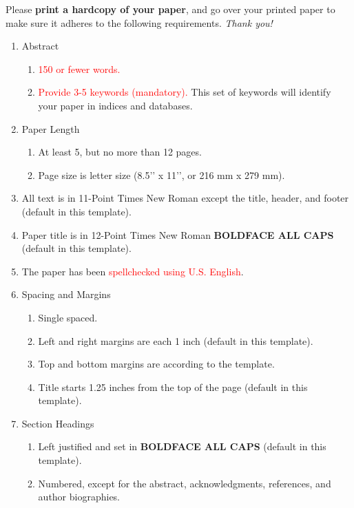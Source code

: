 \documentclass{scspaperproc}
\theoremstyle{scsthe}
\begin{document}
    Please \textbf{print a hardcopy of your paper}, and go over your printed paper to make sure it adheres to the following requirements. \textit{Thank you!}
    \begin{enumerate}
        \item Abstract
        \begin{enumerate}
            \item \textcolor{red}{150 or fewer words.}
            \item \textcolor{red}{Provide 3-5 keywords (mandatory).} This set of keywords will identify your paper in indices and databases.
        \end{enumerate}
        \item Paper Length
        \begin{enumerate}
            \item At least 5, but no more than 12 pages.
            \item Page size is letter size (8.5’’ x 11’’, or 216 mm x 279 mm).
        \end{enumerate}
        \item All text is in 11-Point Times New Roman except the title, header, and footer (default in this template).
        \item Paper title is in 12-Point Times New Roman \textbf{BOLDFACE ALL CAPS} (default in this template).
        \item The paper has been \textcolor{red}{spellchecked using U.S. English}.
        \item Spacing and Margins
        \begin{enumerate}
            \item Single spaced.
            \item Left and right margins are each 1 inch (default in this template).
            \item Top and bottom margins are according to the template.
            \item Title starts 1.25 inches from the top of the page (default in this template).
        \end{enumerate}
        \item Section Headings
        \begin{enumerate}
            \item Left justified and set in \textbf{BOLDFACE ALL CAPS} (default in this template).
            \item Numbered, except for the abstract, acknowledgments, references, and author biographies.

\end{enumerate}
\end{enumerate}
\end{document}
